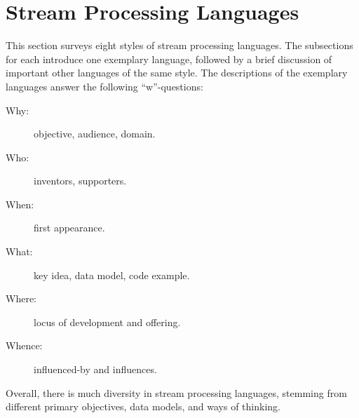 \section{Stream Processing Languages}\label{sec:languages}

This section surveys eight styles of stream processing languages.  The
subsections for each introduce one exemplary language, followed by a
brief discussion of important other languages of the same style. The
descriptions of the exemplary languages answer the following
``w''-questions:

\begin{description}
  \item[Why:] objective, audience, domain.
  \item[Who:] inventors, supporters.
  \item[When:] first appearance.
  \item[What:] key idea, data model, code example.
  \item[Where:] locus of development and offering.
  \item[Whence:] influenced-by and influences.
\end{description}

Overall, there is much diversity in stream processing languages,
stemming from different primary objectives, data models, and ways of
thinking.










